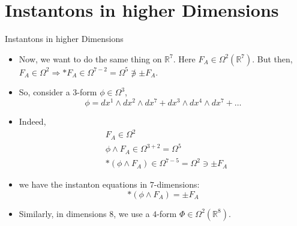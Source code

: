 \documentclass{beamer}
\theoremstyle{definition}
\begin{document}
    \section{Instantons in higher Dimensions}
    \begin{frame}{Instantons in higher Dimensions}{}
		\begin{itemize}
            \item<1-> {Now, we want to do the same thing on $\mathbb{R}^7$. Here $F_A \in \Omega^2(\mathbb{R}^7)$. But then,\\
            $F_A \in \Omega^2 \Rightarrow *F_A \in \Omega^{7-2} = \Omega^5 \not\ni \pm F_A$. }
            \item<2-> {So, consider a $3$-form $\phi \in \Omega^3$,
            $$\phi = dx^1 \wedge dx^2\wedge dx^7 + dx^3 \wedge dx^4 \wedge dx^7 +  \dots$$}
            \item<3-> {Indeed,
            \begin{align*}
            &F_A \in \Omega^2\\
            &\phi \wedge F_A \in \Omega^{3+2} = \Omega^5\\
            &*(\phi \wedge F_A) \in \Omega^{7-5} = \Omega^2 \ni \pm F_A
        \end{align*}}
        \item<4-> {we have the instanton equations in $7$-dimensions:
        $$*(\phi \wedge F_A) = \pm F_A$$}
        \item<5-> {Similarly, in dimensions $8$, we use a $4$-form $\Phi \in \Omega^2(\mathbb{R}^8)$.}
        \end{itemize}
	\end{frame}
\end{document}
